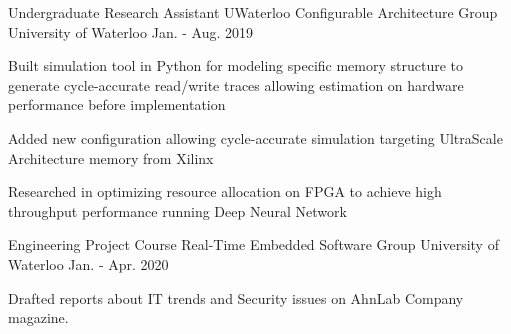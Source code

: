 


\begin{cventries}


\cventry
{Undergraduate Research Assistant} %
{UWaterloo Configurable Architecture Group} %
{University of Waterloo} %
{Jan. - Aug. 2019} %
{ %
\begin{cvitems}
\item {
Built simulation tool in Python for modeling specific memory 
structure to generate cycle-accurate
read/write traces allowing estimation on 
hardware performance before implementation
}
\item {
Added new configuration allowing 
cycle-accurate simulation targeting UltraScale Architecture
memory from Xilinx
}
\item {
Researched in optimizing resource allocation on FPGA 
to achieve high throughput performance
running Deep Neural Network
}
\end{cvitems}
}


\cventry
{Engineering Project Course} %
{Real-Time Embedded Software Group} %
{University of Waterloo} %
{Jan. - Apr. 2020} %
{ %
\begin{cvitems}
\item {
Drafted reports about IT trends and Security 
issues on AhnLab Company magazine.
}
\end{cvitems}
}

\end{cventries}